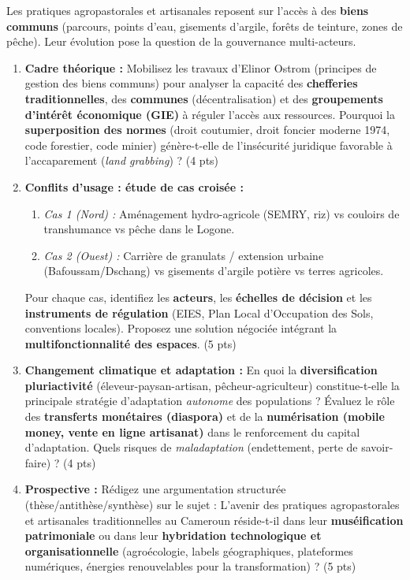 \documentclass[11pt]{article}
\begin{document}
\begin{exercice}
Les pratiques agropastorales et artisanales reposent sur l'accès à des \textbf{biens communs} (parcours, points d'eau, gisements d'argile, forêts de teinture, zones de pêche). Leur évolution pose la question de la gouvernance multi-acteurs.

\begin{enumerate}
    \item \textbf{Cadre théorique :} Mobilisez les travaux d'Elinor Ostrom (principes de gestion des biens communs) pour analyser la capacité des \textbf{chefferies traditionnelles}, des \textbf{communes} (décentralisation) et des \textbf{groupements d'intérêt économique (GIE)} à réguler l'accès aux ressources. Pourquoi la \textbf{superposition des normes} (droit coutumier, droit foncier moderne 1974, code forestier, code minier) génère-t-elle de l'insécurité juridique favorable à l'accaparement (\textit{land grabbing}) ? (4 pts)
    
    \item \textbf{Conflits d'usage : étude de cas croisée :} 
    \begin{enumerate}
        \item \textit{Cas 1 (Nord) :} Aménagement hydro-agricole (SEMRY, riz) vs couloirs de transhumance vs pêche dans le Logone.
        \item \textit{Cas 2 (Ouest) :} Carrière de granulats / extension urbaine (Bafoussam/Dschang) vs gisements d'argile potière vs terres agricoles.
    \end{enumerate}
    Pour chaque cas, identifiez les \textbf{acteurs}, les \textbf{échelles de décision} et les \textbf{instruments de régulation} (EIES, Plan Local d'Occupation des Sols, conventions locales). Proposez une solution négociée intégrant la \textbf{multifonctionnalité des espaces}. (5 pts)
    
    \item \textbf{Changement climatique et adaptation :} En quoi la \textbf{diversification pluriactivité} (éleveur-paysan-artisan, pêcheur-agriculteur) constitue-t-elle la principale stratégie d'adaptation \textit{autonome} des populations ? Évaluez le rôle des \textbf{transferts monétaires (diaspora)} et de la \textbf{numérisation (mobile money, vente en ligne artisanat)} dans le renforcement du capital d'adaptation. Quels risques de \textit{maladaptation} (endettement, perte de savoir-faire) ? (4 pts)
    
    \item \textbf{Prospective :} Rédigez une argumentation structurée (thèse/antithèse/synthèse) sur le sujet : \og L'avenir des pratiques agropastorales et artisanales traditionnelles au Cameroun réside-t-il dans leur \textbf{muséification patrimoniale} ou dans leur \textbf{hybridation technologique et organisationnelle} (agroécologie, labels géographiques, plateformes numériques, énergies renouvelables pour la transformation) ? \fg (5 pts)
\end{enumerate}
\end{exercice}
\end{document}
